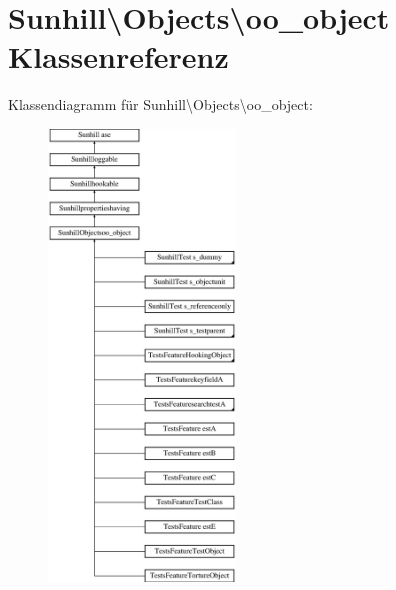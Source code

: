 \hypertarget{classSunhill_1_1Objects_1_1oo__object}{}\section{Sunhill\textbackslash{}Objects\textbackslash{}oo\+\_\+object Klassenreferenz}
\label{classSunhill_1_1Objects_1_1oo__object}
Klassendiagramm für Sunhill\textbackslash{}Objects\textbackslash{}oo\+\_\+object\+:\begin{figure}[H]
\begin{center}
\leavevmode
\includegraphics[height=12.000000cm]{d5/d53/classSunhill_1_1Objects_1_1oo__object}
\end{center}
\end{figure}

